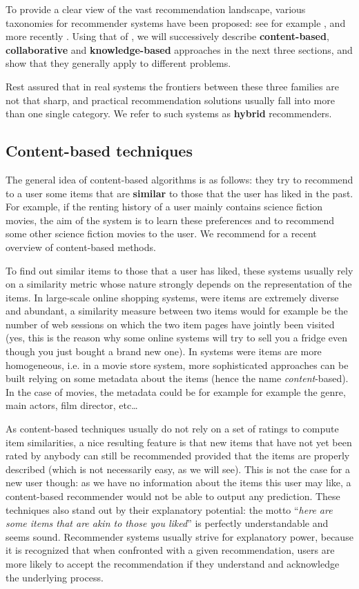 To provide a clear view of the vast recommendation landscape, various taxonomies
for recommender systems have been proposed: see for example \cite{Bur02,
AdoTuzIEEE2005, Bur07}, and more recently \cite{BurRam11}. Using that of
\cite{BurRam11}, we will successively describe \textbf{content-based},
\textbf{collaborative} and \textbf{knowledge-based} approaches in the next
three sections, and show that they generally apply to different problems.

Rest assured that in real systems the frontiers between these three families
are not that sharp, and practical recommendation solutions usually fall into
more than one single category. We refer to such systems as \textbf{hybrid}
recommenders.

\subsection{Content-based techniques}

The general idea of content-based algorithms is as follows: they try to recommend to a user some items that are
\textbf{similar} to those that the user has liked in the past. For example, if
the renting history of a user mainly contains science fiction movies, the aim
of the system is to learn these preferences and to recommend some other science
fiction movies to the user. We recommend \cite{LopGemSem11} for a recent
overview of content-based methods.

To find out similar items to those that a user has liked, these systems usually
rely on a similarity metric whose nature strongly depends on the representation
of the items. In large-scale online shopping systems, were items are extremely
diverse and abundant, a similarity measure between two items would for
example be the number of web sessions on which the two item pages have jointly
been visited (yes, this is the reason why some online systems will try to sell
you a fridge even though you just bought a brand new one). In systems were
items are more homogeneous, i.e. in a movie store system, more  sophisticated
approaches can be built relying on some metadata about the items (hence the
name \textit{content}-based). In the case of movies, the metadata could be for
example for example the genre, main actors, film director, etc\dots

As content-based techniques usually do not rely on a set of ratings to compute item
similarities, a nice resulting feature is that new items that have not yet been
rated by anybody can still be recommended provided that the items are properly
described (which is not necessarily easy, as we will see). This is not the case for a new user
though: as we have no information about the items this user may like, a
content-based recommender would not be able to output any prediction. These
techniques also stand out by their explanatory potential: the motto
``\textit{here are some items that are akin to those you liked}'' is perfectly
understandable and seems sound.  Recommender systems usually strive for
explanatory power, because it is recognized that when confronted with a given
recommendation, users are more likely to accept the recommendation if they
understand and acknowledge the underlying process.

